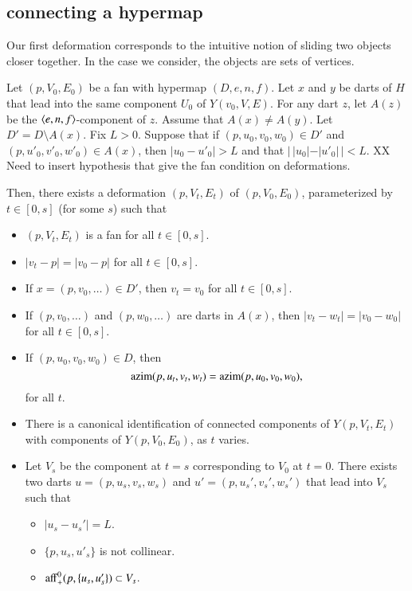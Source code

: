 \subsection{connecting a hypermap}


Our first deformation corresponds to the intuitive
notion of sliding two objects closer together.
In the case we consider, the objects are sets of vertices.

\begin{lemma} Let $(p,V_0,E_0)$ be a fan with hypermap $(D,e,n,f)$.
Let $x$ and $y$ be darts of $H$ that lead into the same
component $U_0$ of $Y(v_0,V,E)$.  For any dart $z$, let $A(z)$
be the $\langle e,n,f\rangle$-component of $z$.
Assume that $A(x)\ne A(y)$.
Let $D' = D\setminus A(x)$.  
Fix $L>0$.
Suppose that if $(p,u_0,v_0,w_0)\in D'$ and
$(p,u'_0,v'_0,w'_0)\in A(x)$, then $|u_0-u'_0|>L$ and
that $|\,|u_0| - |u'_0|\,| < L$.
XX Need to insert hypothesis that give the fan condition
on deformations.

Then, there exists a deformation
$(p,V_t,E_t)$ of $(p,V_0,E_0)$, 
parameterized by $t\in[0,s]$ (for some $s$) 
such that
\begin{itemize}
\item $(p,V_t,E_t)$ is a fan for all $t\in[0,s]$.
\item $|v_t-p| = |v_0-p|$ for all $t\in[0,s]$.
\item If $x=(p,v_0,\ldots)\in D'$, then $v_t=v_0$ for all $t\in[0,s]$.
\item If $(p,v_0,\ldots)$ and $(p,w_0,\ldots)$ are darts
in $A(x)$, then $|v_t-w_t|=|v_0-w_0|$ for all $t\in[0,s]$.
\item If $(p,u_0,v_0,w_0)\in D$, then 
   $$
   {\operatorname{azim}}(p,u_t,v_t,w_t) = {\operatorname{azim}}(p,u_0,v_0,w_0),
   $$
   for all $t$.
\item There is a canonical identification of connected components
of $Y(p,V_t,E_t)$ with components of $Y(p,V_0,E_0)$, as $t$ varies.
\item 
Let $V_s$ be the component at $t=s$ corresponding to $V_0$ at $t=0$.
There exists two darts $u=(p,u_s,v_s,w_s)$ and
$u'=(p,u_s',v_s',w_s')$ that lead into $V_s$ such that
  \begin{itemize} %
  \item $|u_s-u_s'| = L$.
  \item $\{p,u_s,u'_s\}$ is not collinear.
  \item ${\operatorname{aff}}_+^0(p,\{u_s,u_s'\}) \subset V_s$.
  \end{itemize} %
\end{itemize}
\end{lemma}

